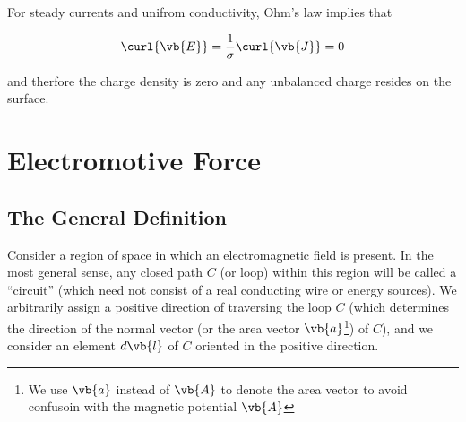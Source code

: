 \documentclass[english,a4paper,12pt]{report}
\begin{document}
For steady currents and unifrom conductivity, Ohm's law implies that 

\begin{equation}
    \curl{\vb{E} } = \frac{1}{\sigma } \curl{\vb{J} } = 0  
\end{equation}
 
and therfore the charge density is zero and any unbalanced charge resides on the surface.



\section{Electromotive Force}

\subsection{The General Definition}

Consider a region of space in which an electromagnetic field is present. In the most general sense, any closed path \(C\) (or loop) within this region will be called a ``circuit'' (which need not consist of a real conducting wire or energy sources). We arbitrarily assign a positive direction of traversing the loop \(C\) (which determines the direction of the normal vector (or the area vector \(\vb{a} \)\footnote{We use \(\vb{a} \) instead of \(\vb{A} \) to denote the area vector to avoid confusoin with the magnetic potential \(\vb{A} \)}) of \(C\)), and we consider an element \(d \vb{l} \) of \(C\) oriented in the positive direction. 

\begin{center}
\end{center}
\end{document}
